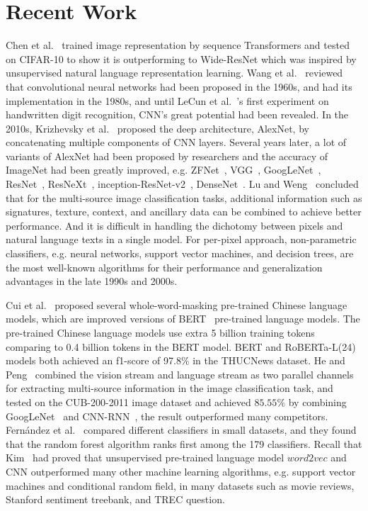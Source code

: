 \documentclass[runningheads]{llncs}
\begin{document}

\section{Recent Work}

  Chen et al.~\cite{chen2020generative} trained image representation by sequence Transformers and tested on CIFAR-10 to show it is outperforming to Wide-ResNet
which was inspired by unsupervised natural language representation learning.
  Wang et al.~\cite{wang2019development} reviewed that convolutional neural networks had been proposed in the 1960s, and had its implementation in the 1980s,
and until LeCun et al.~\cite{lecun1990handwritten}'s first experiment on handwritten digit recognition, CNN's great potential had been revealed.
  In the 2010s, Krizhevsky et al.~\cite{krizhevsky2012imagenet} proposed the deep architecture, AlexNet, by concatenating multiple components of CNN layers.
Several years later, a lot of variants of AlexNet had been proposed by researchers and the accuracy of ImageNet had been greatly improved, e.g. ZFNet~\cite{zeiler2014visualizing}, VGG~\cite{simonyan2014very}, GoogLeNet~\cite{szegedy2015going}, ResNet~\cite{he2016deep},
  ResNeXt~\cite{xie2017aggregated}, inception-ResNet-v2~\cite{szegedy2016inception}, DenseNet~\cite{huang2016deep}.
  Lu and Weng~\cite{lu2007survey} concluded that for the multi-source image classification tasks, additional information such as signatures, texture, context, and ancillary data can be combined to achieve better performance.
And it is difficult in handling the dichotomy between pixels and natural language texts in a single model.
For per-pixel approach, non-parametric classifiers, e.g. neural networks, support vector machines, and decision trees,
are the most well-known algorithms for their performance and generalization advantages in the late 1990s and 2000s.
 \par Cui et al.~\cite{cui2020revisiting} proposed several whole-word-masking pre-trained Chinese language models, which are improved versions of BERT~\cite{devlin2019bert} pre-trained language models.
The pre-trained Chinese language models use extra 5 billion training tokens comparing to 0.4 billion tokens in the BERT model. BERT and RoBERTa-L(24) models both achieved an f1-score of 97.8\% in the THUCNews dataset.
  He and Peng~\cite{he2017fine} combined the vision stream and language stream as two parallel channels for extracting multi-source information in the image classification task,
and tested on the CUB-200-2011 image dataset and achieved $85.55\%$ by combining GoogLeNet~\cite{szegedy2015going} and CNN-RNN~\cite{reed2016learning}, the result outperformed many competitors.
  Fern{\'a}ndez et al.~\cite{fernandez2014we} compared different classifiers in small datasets, and they found that the random forest algorithm ranks first among the 179 classifiers.
  Recall that Kim~\cite{kim2014convolutional} had proved that unsupervised pre-trained language model $word2vec$ and CNN outperformed many other machine learning algorithms,
e.g. support vector machines and conditional random field, in many datasets such as movie reviews, Stanford sentiment treebank, and TREC question.
\end{document}
